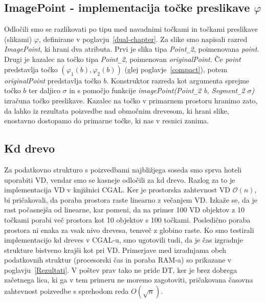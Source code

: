 \documentclass[a4paper, 12pt]{book}
\newcommand{\OO}{\ensuremath{\mathcal{O}}} %
\newcommand{\U}{\texttt{\_}}
\begin{document}
\subsection{ImagePoint - implementacija točke preslikave $\varphi$}
Odločili smo se razlikovati po tipu med navadnimi točkami in točkami preslikave (slikami) $\varphi$, definirane v poglavju~\ref{dual-chapter}. Za slike smo napisali razred \textit{ImagePoint}, ki hrani dva atributa. Prvi je slika tipa \textit{Point\texttt{\_}2}, poimenovana \textit{point}. Drugi je kazalec na točko tipa \textit{Point\texttt{\_}2}, poimenovan \textit{originalPoint}. Če \textit{point} predstavlja točko $(\varphi_1(b), \varphi_2(b))$ (glej poglavje~\ref{compact}), potem \textit{originalPoint} predstavlja točko $b$. Konstruktor razreda kot argumenta sprejme točko $b$ ter daljico $\sigma$ in s pomočjo funkcije \textit{imagePoint(Point\U 2 b, Segment\U 2 $\sigma$)} izračuna točko preslikave. Kazalec na točko v primarnem prostoru hranimo zato, da lahko iz rezultata poizvedbe nad območnim drevesom, ki hrani slike, enostavno dostopamo do primarne točke, ki nas v resnici zanima.

\subsection{Kd drevo}
Za podatkovno strukturo s poizvedbami najbližjega soseda smo sprva hoteli uporabiti VD, vendar smo se kasneje odločili za kd drevo. Razlog za to je implementacija VD v knjižnici CGAL. Ker je prostorska zahtevnost VD $\OO(n)$, bi pričakovali, da poraba prostora raste linearno z večanjem VD. Izkaže se, da je rast počasnejša od linearne, kar pomeni, da na primer 100 VD objektov z 10 točkami porabi več prostora kot 10 objektov s 100 točkami. Posledično poraba prostora ni enaka za vsak nivo drevesa, temveč z globino raste. Ko smo testirali implementacijo kd dreves v CGAL-u, smo ugotovili tudi, da je čas izgradnje strukture bistveno krajši kot pri VD. Primerjave med izradnjama obeh podatkovnih struktur (procesorski čas in poraba RAM-a) so prikazane v poglavju~\ref{Rezultati}. V poštev prav tako ne pride DT, ker je brez dobrega začetnega lica, ki ga v tem primeru ne moremo zagotoviti, pričakovana časovna zahtevnost poizvedbe s sprehodom reda $O(\sqrt{n})$.
\end{document}
